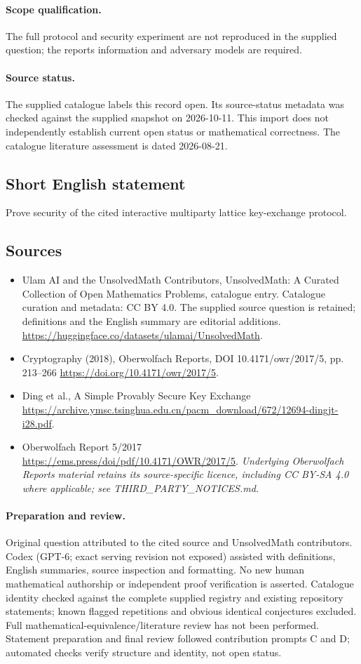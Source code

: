 \documentclass[11pt]{article}
\begin{document}
\paragraph{Scope qualification.}
The full protocol and security experiment are not reproduced in the supplied question; the report\textquotesingle s information and adversary models are required.
\paragraph{Source status.}
The supplied catalogue labels this record open. Its source-status metadata was checked against the supplied snapshot on 2026-10-11. This import does not independently establish current open status or mathematical correctness. The catalogue literature assessment is dated 2026-08-21.
\subsection{Short English statement}
Prove security of the cited interactive multiparty lattice key-exchange protocol.
\subsection{Sources}
\begin{itemize}
\item[S1] Ulam AI and the UnsolvedMath Contributors, UnsolvedMath: A Curated Collection of Open Mathematics Problems, catalogue entry. Catalogue curation and metadata: CC BY 4.0. The supplied source question is retained; definitions and the English summary are editorial additions.
\url{https://huggingface.co/datasets/ulamai/UnsolvedMath}.
\item[S2] Cryptography (2018), Oberwolfach Reports, DOI 10.4171/owr/2017/5, pp. 213--266
\url{https://doi.org/10.4171/owr/2017/5}.
\item[S3] Ding et al., A Simple Provably Secure Key Exchange
\url{https://archive.ymsc.tsinghua.edu.cn/pacm_download/672/12694-dingjt-i28.pdf}.
\item[S4] Oberwolfach Report 5/2017
\url{https://ems.press/doi/pdf/10.4171/OWR/2017/5}.
\textit{Underlying Oberwolfach Reports material retains its source-specific licence, including CC BY-SA 4.0 where applicable; see THIRD\_PARTY\_NOTICES.md.}
\end{itemize}
\paragraph{Preparation and review.}
Original question attributed to the cited source and UnsolvedMath contributors. Codex (GPT-6; exact serving revision not exposed) assisted with definitions, English summaries, source inspection and formatting. No new human mathematical authorship or independent proof verification is asserted. Catalogue identity checked against the complete supplied registry and existing repository statements; known flagged repetitions and obvious identical conjectures excluded. Full mathematical-equivalence/literature review has not been performed. Statement preparation and final review followed contribution prompts C and D; automated checks verify structure and identity, not open status.
\label{end:statement}
\end{document}

